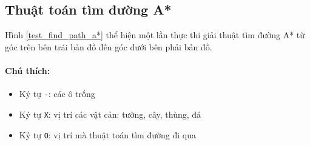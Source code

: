 \documentclass[12pt,a4paper]{article}
\begin{document}
  \subsection{Thuật toán tìm đường A*}
  Hình \ref{test_find_path_a*} thể hiện một lần thực thi giải thuật tìm đường A* từ góc trên bên trái bản đồ đến góc dưới bên phải bản đồ.
  \paragraph{Chú thích:}
  \begin{itemize}
      \item Ký tự \texttt{-}: các ô trống
      \item Ký tự \texttt{X}: vị trí các vật cản: tường, cây, thùng, đá
      \item Ký tự \texttt{O}: vị trí mà thuật toán tìm đường đi qua
  \end{itemize}
\end{document}
